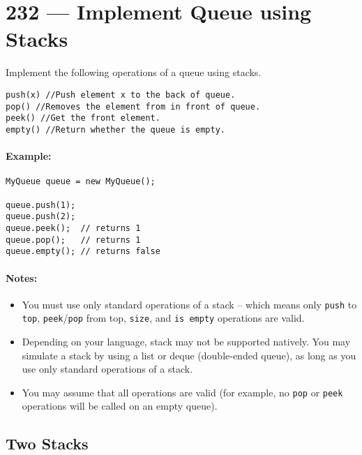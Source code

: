 \section{232 --- Implement Queue using Stacks}
Implement the following operations of a queue using stacks.
\begin{flushleft}
\begin{lstlisting}[style=customc]
push(x) //Push element x to the back of queue.
pop() //Removes the element from in front of queue.
peek() //Get the front element.
empty() //Return whether the queue is empty.
\end{lstlisting}
\end{flushleft}

\paragraph{Example:}

\begin{flushleft}
\begin{lstlisting}[style=customc]
MyQueue queue = new MyQueue();

queue.push(1);
queue.push(2);  
queue.peek();  // returns 1
queue.pop();   // returns 1
queue.empty(); // returns false
\end{lstlisting}
\end{flushleft}

\paragraph{Notes:}

\begin{itemize}
\item You must use only standard operations of a stack -- which means only \texttt{push} to \texttt{top}, \texttt{peek}/\texttt{pop} from top, \texttt{size}, and \texttt{is empty} operations are valid.
\item Depending on your language, stack may not be supported natively. You may simulate a stack by using a list or deque (double-ended queue), as long as you use only standard operations of a stack.
\item You may assume that all operations are valid (for example, no \texttt{pop} or \texttt{peek} operations will be called on an empty queue).
\end{itemize}
\subsection{Two Stacks}

